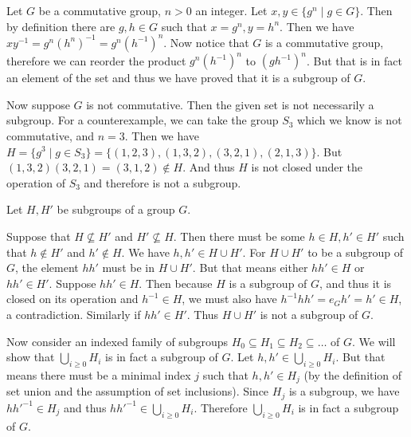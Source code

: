 \begin{problem}
\end{problem}

\begin{solution}
	Let $G$ be a commutative group, $n > 0$ an integer. Let $x, y \in \{ g^n \mid g \in G \}$. Then by definition there are $g, h \in G$ such that $x = g^n, y = h^n$. Then we have $x y^{-1} = g^n (h^n)^{-1} = g^n (h^{-1})^n$. Now notice that $G$ is a commutative group, therefore we can reorder the product $g^n (h^{-1})^n$ to $(gh^{-1})^n$. But that is in fact an element of the set and thus we have proved that it is a subgroup of $G$.
	
	Now suppose $G$ is not commutative. Then the given set is not necessarily a subgroup. For a counterexample, we can take the group $S_3$ which we know is not commutative, and $n = 3$. Then we have $H = \{g^3 \mid g \in S_3\} = \{(1, 2, 3), (1, 3, 2), (3, 2, 1), (2, 1, 3)\}$. But $(1, 3, 2)(3, 2, 1) = (3, 1, 2) \not \in H$. And thus $H$ is not closed under the operation of $S_3$ and therefore is not a subgroup.
\end{solution}

\begin{problem}
\end{problem}

\begin{solution}
	Let $H, H'$ be subgroups of a group $G$.
	
	Suppose that $H \not \subseteq H'$ and $H' \not \subseteq H$. Then there must be some $h \in H, h' \in H'$ such that $h \not \in H'$ and $h' \not \in H$. We have $h, h' \in H \cup H'$. For $H \cup H'$ to be a subgroup of $G$, the element $h h'$ must be in $H \cup H'$. But that means either $h h' \in H$ or $h h' \in H'$. Suppose $h h' \in H$. Then because $H$ is a subgroup of $G$, and thus it is closed on its operation and $h^{-1} \in H$, we must also have $h^{-1} h h' = e_G h' = h' \in H$, a contradiction. Similarly if $h h' \in H'$. Thus $H \cup H'$ is not a subgroup of $G$.
	
	Now consider an indexed family of subgroups $H_0 \subseteq H_1 \subseteq H_2 \subseteq \dots$ of $G$. We will show that $\bigcup_{i \geq 0} H_i$ is in fact a subgroup of $G$. Let $h, h' \in \bigcup_{i \geq 0} H_i$. But that means there must be a minimal index $j$ such that $h, h' \in H_j$ (by the definition of set union and the assumption of set inclusions). Since $H_j$ is a subgroup, we have $h h'^{-1} \in H_j$ and thus $h h'^{-1} \in \bigcup_{i \geq 0} H_i$. Therefore $\bigcup_{i \geq 0} H_i$ is in fact a subgroup of $G$.
\end{solution}

